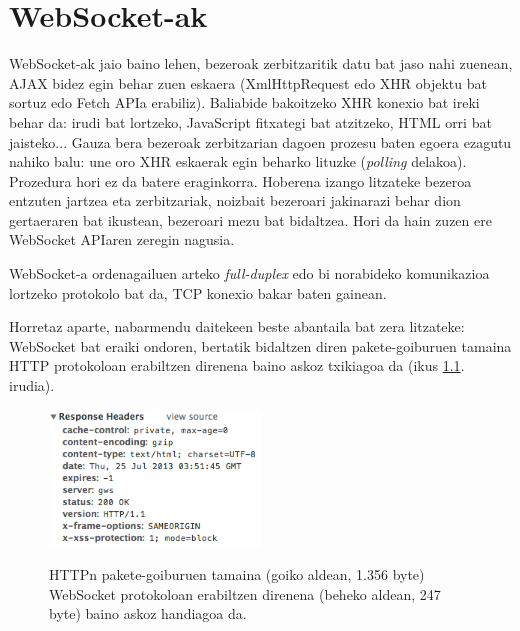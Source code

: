 \chapter{WebSocket-ak}

WebSocket-ak jaio baino lehen, bezeroak zerbitzaritik datu bat jaso nahi zuenean, AJAX bidez egin behar zuen eskaera (XmlHttpRequest edo XHR objektu bat sortuz edo Fetch APIa erabiliz). Baliabide bakoitzeko XHR konexio bat ireki behar da: irudi bat lortzeko, JavaScript fitxategi bat atzitzeko, HTML orri bat jaisteko... 
Gauza bera bezeroak zerbitzarian dagoen prozesu baten egoera ezagutu nahiko balu:  une oro XHR eskaerak egin beharko lituzke (\textit{polling} delakoa). Prozedura hori ez da batere eraginkorra. Hoberena izango litzateke bezeroa entzuten jartzea eta zerbitzariak, noizbait bezeroari jakinarazi behar dion gertaeraren bat ikustean, bezeroari mezu bat bidaltzea. Hori da hain zuzen ere WebSocket APIaren zeregin nagusia. 

WebSocket-a ordenagailuen arteko \textit{full-duplex} edo bi norabideko komunikazioa lortzeko protokolo bat da, TCP konexio bakar baten gainean.

Horretaz aparte, nabarmendu daitekeen beste abantaila bat zera litzateke: WebSocket bat eraiki ondoren, bertatik bidaltzen diren pakete-goiburuen tamaina HTTP protokoloan erabiltzen direnena baino askoz txikiagoa da (ikus \ref{fig:wsheader}. irudia).


\begin{figure}[ht]
	\centering
{}
{\includegraphics[trim=0cm 0cm 0cm 0cm, clip=true, width=0.5\textwidth]{img/ws_header.png}}
\caption{HTTPn pakete-goiburuen tamaina (goiko aldean, 1.356 byte) WebSocket protokoloan erabiltzen direnena (beheko aldean, 247 byte) baino askoz handiagoa da.}
\label{fig:wsheader}
\end{figure}


